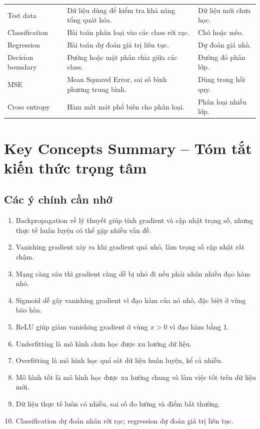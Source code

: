 \begin{longtable}{p{}p{}p{}}
Test data & Dữ liệu dùng để kiểm tra khả năng tổng quát hóa. & Dữ liệu mới chưa học. \\

Classification & Bài toán phân loại vào các class rời rạc. & Chó hoặc mèo. \\

Regression & Bài toán dự đoán giá trị liên tục. & Dự đoán giá nhà. \\

Decision boundary & Đường hoặc mặt phân chia giữa các class. & Đường đỏ phân lớp. \\

MSE & Mean Squared Error, sai số bình phương trung bình. & Dùng trong hồi quy. \\

Cross entropy & Hàm mất mát phổ biến cho phân loại. & Phân loại nhiều lớp. \\

\bottomrule
\end{longtable}
\normalsize

\section{Key Concepts Summary -- Tóm tắt kiến thức trọng tâm}

\subsection{Các ý chính cần nhớ}

\begin{enumerate}
    \item Backpropagation về lý thuyết giúp tính gradient và cập nhật trọng số, nhưng thực tế huấn luyện có thể gặp nhiều vấn đề.
    \item Vanishing gradient xảy ra khi gradient quá nhỏ, làm trọng số cập nhật rất chậm.
    \item Mạng càng sâu thì gradient càng dễ bị nhỏ đi nếu phải nhân nhiều đạo hàm nhỏ.
    \item Sigmoid dễ gây vanishing gradient vì đạo hàm của nó nhỏ, đặc biệt ở vùng bão hòa.
    \item ReLU giúp giảm vanishing gradient ở vùng $x>0$ vì đạo hàm bằng 1.
    \item Underfitting là mô hình chưa học được xu hướng dữ liệu.
    \item Overfitting là mô hình học quá sát dữ liệu huấn luyện, kể cả nhiễu.
    \item Mô hình tốt là mô hình học được xu hướng chung và làm việc tốt trên dữ liệu mới.
    \item Dữ liệu thực tế luôn có nhiễu, sai số đo lường và điểm bất thường.
    \item Classification dự đoán nhãn rời rạc; regression dự đoán giá trị liên tục.
\end{enumerate}

